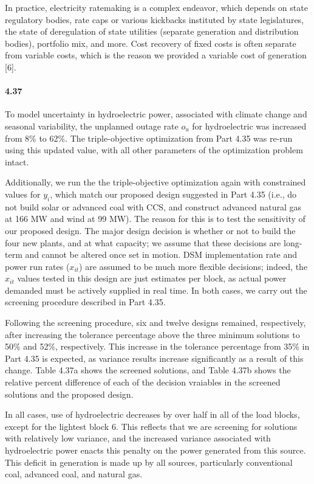 \documentclass{article}
\begin{document}
	In practice, electricity ratemaking is a complex endeavor, which depends on state regulatory bodies, rate caps or various kickbacks instituted by state legislatures, the state of deregulation of state utilities (separate generation and distribution bodies), portfolio mix, and more. Cost recovery of fixed costs is often separate from variable costs, which is the reason we provided a variable cost of generation [6]. 
	
	
	
\paragraph{4.37}
	To model uncertainty in hydroelectric power, associated with climate change and seasonal variability, the unplanned outage rate $o_u$ for hydroelectric was increased from 8\% to 62\%. The triple-objective optimization from Part 4.35 was re-run using this updated value, with all other parameters of the optimization problem intact. 
	
	Additionally, we run the the triple-objective optimization again with constrained values for $y_i$, which match our proposed design suggested in Part 4.35 (i.e., do not build solar or advanced coal with CCS, and construct advanced natural gas at 166 MW and wind at 99 MW). The reason for this is to test the sensitivity of our proposed design. The major design decision is whether or not to build the four new plants, and at what capacity; we assume that these decisions are long-term and cannot be altered once set in motion. DSM implementation rate and power run rates ($x_{it}$) are assumed to be much more flexible decisions; indeed, the $x_{it}$ values tested in this design are just estimates per block, as actual power demanded must be actively supplied in real time. In both cases, we carry out the screening procedure described in Part 4.35. 
	
	Following the screening procedure, six and twelve designs remained, respectively, after increasing the tolerance percentage above the three minimum solutions to 50\% and 52\%, respectively. This increase in the tolerance percentage from 35\% in Part 4.35 is expected, as variance results increase significantly as a result of this change. Table 4.37a shows the screened solutions, and Table 4.37b shows the relative percent difference of each of the decision vraiables in the screened solutions and the proposed design.
	
	In all cases, use of hydroelectric decreases by over half in all of the load blocks, except for the lightest block 6. This reflects that we are screening for solutions with relatively low variance, and the increased variance associated with hydroelectric power enacts this penalty on the power generated from this source. This deficit in generation is made up by all sources, particularly conventional coal, advanced coal, and natural gas. 
	
\end{document}
